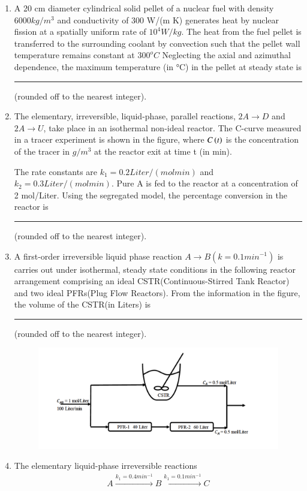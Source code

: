 \documentclass[journal,12pt,onecolumn]{IEEEtran}
\theoremstyle{remark}
\begin{document}
\begin{enumerate}
    \item A 20 cm diameter cylindrical solid pellet of a nuclear fuel with density $6000 kg/m^3$ and conductivity of 300 W/(m K) generates heat by nuclear fission at a spatially uniform rate of $10^4 W /kg$. The heat from the fuel pellet is transferred to the surrounding coolant by convection such that the pellet wall temperature remains constant at $300^oC$ Neglecting the axial and azimuthal dependence, the maximum temperature (in °C) in the pellet at steady state is \rule{2cm}{0.1mm} (rounded off to the nearest integer). 
\newpage
    \item The elementary, irreversible, liquid-phase, parallel reactions, $2A \to D$ and $2A\to U$, take place in an isothermal non-ideal reactor. The C-curve measured in a tracer experiment is shown in the figure, where $C\left(t\right)$ is the concentration of the tracer in $g/m^3$ at the reactor exit at time t (in min). 




    The rate constants are $k_1 = 0.2 Liter/(mol min)$ and $k_2 = 0.3 Liter/(mol min)$. Pure A is fed to the reactor at a concentration of 2 mol/Liter. Using the segregated model, the percentage conversion in the reactor is \rule{1.5cm}{0.1mm}(rounded off to the nearest integer).

    \item A first-order irreversible liquid phase reaction $A \to B(k = 0.1 min^{-1})$ is carries out under isothermal, steady state conditions in the following reactor arrangement comprising an ideal CSTR(Continuous-Stirred Tank Reactor) and two ideal PFRs(Plug Flow Reactors). From the information in the figure, the volume of the CSTR(in Liters) is \rule{1.5cm}{0.1mm}(rounded off to the nearest integer).
\begin{figure}[H]
    \centering
    \includegraphics[width=0.6 \columnwidth]{Fig/46.png}
    \caption*{}
    \label{fig: 46}
\end{figure}
    \item The elementary liquid-phase irreversible reactions 
\begin{align*}
     A \xrightarrow{{k_1 = 0.4 min^{-1}}} B \xrightarrow{{k_1 = 0.1 min^{-1}}} C
\end{align*}


\end{enumerate}
\end{document}
